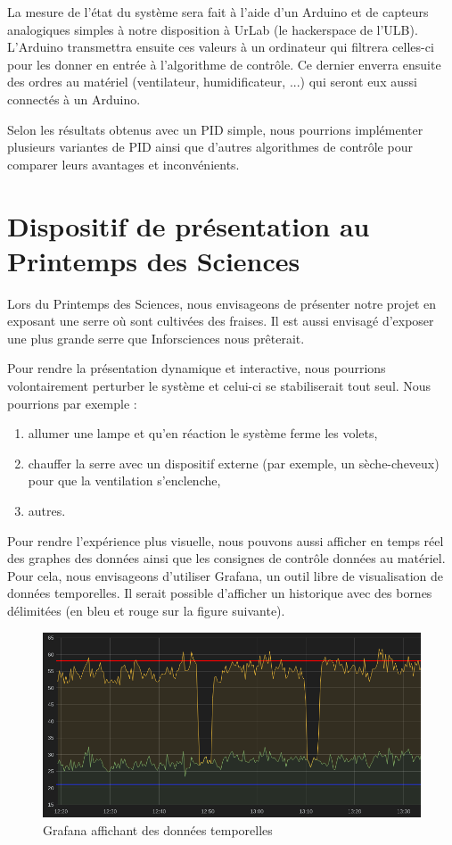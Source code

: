 \documentclass[a4paper,10pt]{article}
\begin{document}
La mesure de l'état du système sera fait à l'aide d'un Arduino et de capteurs analogiques simples à notre disposition à UrLab (le hackerspace de l'ULB). L'Arduino transmettra ensuite ces valeurs à un ordinateur qui filtrera celles-ci pour les donner en entrée à l'algorithme de contrôle. Ce dernier enverra ensuite des ordres au matériel (ventilateur, humidificateur, ...) qui seront eux aussi connectés à un Arduino.

Selon les résultats obtenus avec un PID simple, nous pourrions implémenter plusieurs variantes de PID ainsi que d'autres algorithmes de contrôle pour comparer leurs avantages et inconvénients.


\section{Dispositif de présentation au Printemps des Sciences}

Lors du Printemps des Sciences, nous envisageons de présenter notre projet en exposant une serre où sont cultivées des fraises. Il est aussi envisagé d'exposer une plus grande serre que Inforsciences nous prêterait.

Pour rendre la présentation dynamique et interactive, nous pourrions volontairement perturber le système et celui-ci se stabiliserait tout seul. Nous pourrions par exemple :
\begin{enumerate}
	\item allumer une lampe et qu'en réaction le système ferme les volets,
	\item chauffer la serre avec un dispositif externe (par exemple, un sèche-cheveux) pour que la ventilation s'enclenche,
	\item autres.
\end{enumerate}


Pour rendre l'expérience plus visuelle, nous pouvons aussi afficher en temps réel des graphes des données ainsi que les consignes de contrôle données au matériel. Pour cela, nous envisageons d'utiliser Grafana, un outil libre de visualisation de données temporelles. Il serait possible d'afficher un historique avec des bornes délimitées (en bleu et rouge sur la figure suivante). \\

\thispagestyle{empty}
\begin{figure}[H]
\centering
\includegraphics[scale=0.5]{figures/Grafana.png}
\caption{Grafana affichant des données temporelles}
\label{grafana}
\end{figure}
\end{document}
